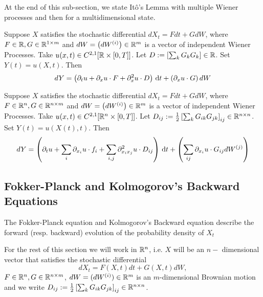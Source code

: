 At the end of this sub-section, we state It\^o's Lemma with multiple Wiener
processes and then for a multidimensional state.

\begin{thm} Suppose $X$ satisfies the stochastic
differential $dX_t = F dt + G dW$, where $ F \in { \mathbb{R} }, G \in { \mathbb{R} }^{1\times m}$ and
$dW = \left(dW^{(i)}\right) \in  { \mathbb{R} }^{m}$ is a vector of independent Wiener
Processes. Take $u(x,t) \in C^{2,1}[ { \mathbb{R} } \times [0,T]]$. Let $D :=\left[{\sum_k
G_{k} G_{k} } \right] \in { \mathbb{R} }$. Set $Y(t) = u(X,t)$. Then
$$
dY =  \left( {\partial}_t u +  {\partial}_{x} u \cdot F + 
  {\partial}^2_{x} u \cdot D \right)
\, \mathrm{d} t +
 \left(  {\partial}_{x} u  \cdot  G \right) dW  
$$
\end{thm}

\begin{thm}
Suppose $X$ satisfies the stochastic differential $dX_t = F dt + G dW$, where $
F \in { \mathbb{R} }^n, G \in { \mathbb{R} }^{n\times m}$ and $dW = \left(dW^{(i)}\right) \in  { \mathbb{R} }^{ 
m}$ is a vector of independent Wiener Processes. Take $u(x,t) \in C^{2,1}[ { \mathbb{R} }^n
\times [0,T]]$. Let $D_{ij} := \tfrac{1}{2} \left[{\sum_k G_{ik} G_{jk} }
\right]_{ij} \in { \mathbb{R} }^{n\times n} $. Set $Y(t) = u(X(t),t)$. Then
$$
dY =  \left( {\partial}_t u + \sum_i {\partial}_{x_i} u \cdot f_i + 
\sum_{i,j} {\partial}^2_{x_i x_j} u \cdot D_{ij} \right)
\, \mathrm{d} t +
 \left(  \sum_{ij} {\partial}_{x_i} u  \cdot G_{ij} dW^{(j)} 
\right)$$
\end{thm} 

\subsection{Fokker-Planck and Kolmogorov's Backward Equations}
The Fokker-Planck equation and Kolmogorov's Backward equation describe the
forward (resp. backward)  evolution of the probability density of $X_t$

For the rest of this section we will work in $ { \mathbb{R} }^n$, i.e. $X$ will be an $n-$
dimensional vector that satisfies the stochastic differential
\begin{equation}
dX_t = F(X,t) dt + G(X,t) dW,
\label{eq:generic_Ito_SDE_Rn}
\end{equation}
$F \in { \mathbb{R} }^n, G \in { \mathbb{R} }^{n \times m}$,
$dW = (dW^{(i)}) \in  { \mathbb{R} }^{  m}$ is an $m$-dimensional Brownian motion and we
write $D_{ij} :=
\tfrac{1}{2} 
\left[{\sum_k G_{ik} G_{jk} } \right]_{ij} \in { \mathbb{R} }^{n\times n} $.

